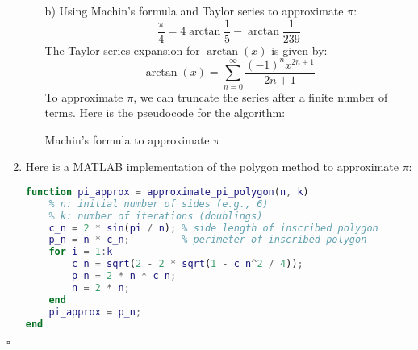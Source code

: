 \documentclass[11pt,a4paper]{article}
\theoremstyle{definition}
\newenvironment{solution}{\par\noindent{\it Solution.} }{\hfill $\square$ \par}
\begin{document}
\begin{solution}
\begin{enumerate}
\begin{itemize}
  \item[b)] Using Machin's formula and Taylor series to approximate $\pi$:
\[\frac{\pi}{4} = 4 \arctan \frac{1}{5} - \arctan \frac{1}{239}\]
The Taylor series expansion for $\arctan(x)$ is given by:
\[\arctan(x) = \sum_{n=0}^{\infty} \frac{(-1)^n x^{2n+1}}{2n+1}\]
To approximate $\pi$, we can truncate the series after a finite number of terms. Here is the pseudocode for the algorithm:\\
\begin{algorithm}[H]
\BlankLine
{}
\caption{Machin's formula to approximate $\pi$}
\end{algorithm}
\end{itemize}
  \item Here is a MATLAB implementation of the polygon method to approximate $\pi$:
\begin{lstlisting}[language=Matlab, caption=Polygon Method to Approximate Pi]
function pi_approx = approximate_pi_polygon(n, k)
    % n: initial number of sides (e.g., 6)
    % k: number of iterations (doublings)
    c_n = 2 * sin(pi / n); % side length of inscribed polygon
    p_n = n * c_n;         % perimeter of inscribed polygon
    for i = 1:k
        c_n = sqrt(2 - 2 * sqrt(1 - c_n^2 / 4));
        p_n = 2 * n * c_n;
        n = 2 * n;
    end
    pi_approx = p_n;
end
\end{lstlisting}
\end{enumerate}
\end{solution}
\vfill
{}
\end{document}
